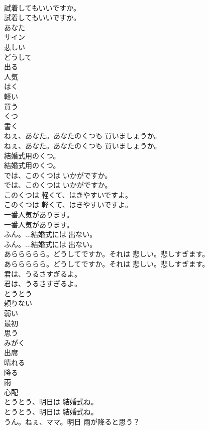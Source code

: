 \documentclass[8pt]{extreport}
\begin{document}
\begin{CJK}{UTF8}{min}
\\	試着してもいいですか。	
\\	試着してもいいですか。 
\\	あなた
\\	サイン
\\	悲しい
\\	どうして
\\	出る
\\	人気
\\	はく
\\	軽い
\\	買う
\\	くつ
\\	書く
\\	ねぇ、あなた。あなたのくつも 買いましょうか。	
\\	ねぇ、あなた。あなたのくつも 買いましょうか。 
\\	結婚式用のくつ。	
\\	結婚式用のくつ。 
\\	では、このくつは いかがですか。	
\\	では、このくつは いかがですか。 
\\	このくつは 軽くて、はきやすいですよ。	
\\	このくつは 軽くて、はきやすいですよ。 
\\	一番人気があります。	
\\	一番人気があります。 
\\	ふん。...結婚式には 出ない。	
\\	ふん。...結婚式には 出ない。 
\\	あららららら。どうしてですか。それは 悲しい。悲しすぎます。	
\\	あららららら。どうしてですか。それは 悲しい。悲しすぎます。 
\\	君は、うるさすぎるよ。	
\\	君は、うるさすぎるよ。 
\\	とうとう
\\	頼りない
\\	弱い
\\	最初
\\	思う
\\	みがく
\\	出席
\\	晴れる
\\	降る
\\	雨
\\	心配
\\	とうとう、明日は 結婚式ね。	
\\	とうとう、明日は 結婚式ね。 
\\	うん。ねぇ、ママ。明日 雨が降ると思う？	

\end{CJK}
\end{document}
